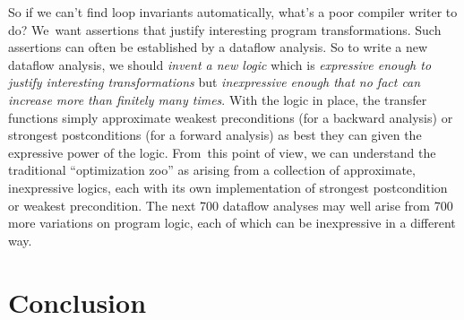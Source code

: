 \documentclass[blockstyle,preprint,natbib,nocopyrightspace]{sigplanconf}
\newcommand\join{\sqcup}
\newcommand\true{\ensuremath{\mathbf{true}}}
\newcommand\implies{\supseteq}  %
\newcommand\secref[1]{Section~\ref{sec:#1}}
\begin{document}
So if we can't find loop invariants automatically, what's a poor
compiler writer to do?
We~want assertions that justify interesting program
transformations. 
Such assertions can often be established by a dataflow analysis.
So to write a new dataflow analysis, we
should \emph{invent a new logic} which is
\emph{expressive enough to justify interesting transformations}
but \emph{inexpressive enough that no fact can increase more than
finitely many times}.
With the logic in place, the transfer functions simply approximate
  weakest preconditions (for a backward analysis) or strongest
  postconditions (for a forward analysis) as best they can
given the expressive power of the logic.
From~this point of view, we can understand the traditional
``optimization zoo'' as arising from a collection of approximate,
inexpressive logics, each with its own implementation of strongest postcondition
or weakest precondition. 
The next 700 dataflow analyses may well
arise from 700 more variations on 
program logic, each of which can be inexpressive in a different way.




\section{Conclusion}
\end{document}
